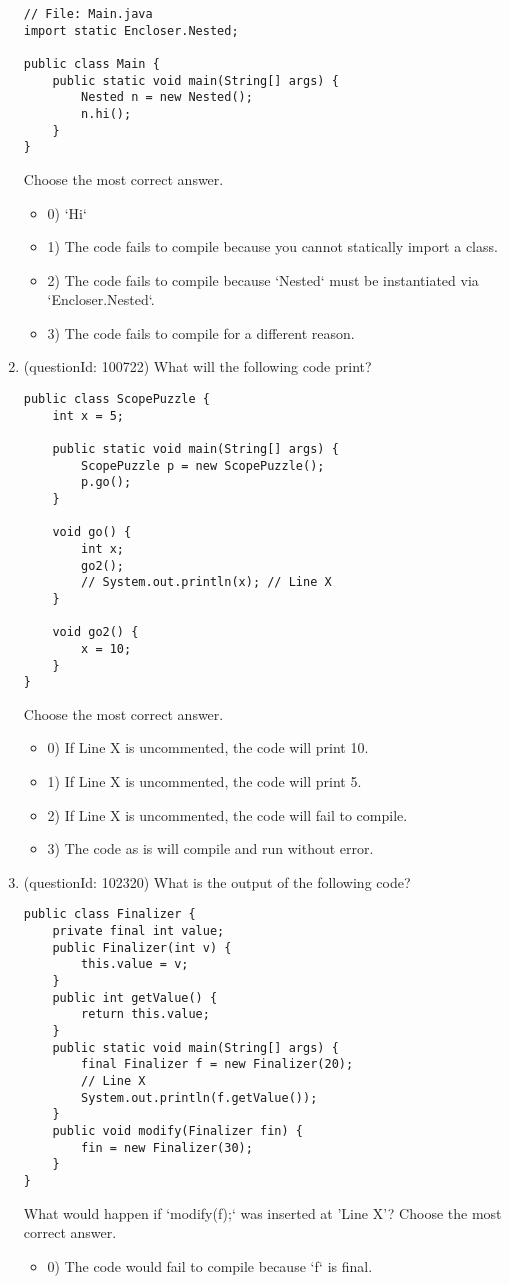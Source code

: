 \documentclass[12pt]{article}
\begin{document}
\begin{enumerate}[label=(\arabic*)]
\begin{verbatim}
// File: Main.java
import static Encloser.Nested;

public class Main {
    public static void main(String[] args) {
        Nested n = new Nested();
        n.hi();
    }
}
\end{verbatim}
Choose the most correct answer. 
\begin{itemize}
\item 0) `Hi`

\item 1) The code fails to compile because you cannot statically import a class.

\item 2) The code fails to compile because `Nested` must be instantiated via `Encloser.Nested`.

\item 3) The code fails to compile for a different reason.

\end{itemize}
\item (questionId: 100722) What will the following code print?\n\begin{verbatim}
public class ScopePuzzle {
    int x = 5;

    public static void main(String[] args) {
        ScopePuzzle p = new ScopePuzzle();
        p.go();
    }

    void go() {
        int x;
        go2();
        // System.out.println(x); // Line X
    }

    void go2() {
        x = 10;
    }
}
\end{verbatim}
Choose the most correct answer. 
\begin{itemize}
\item 0) If Line X is uncommented, the code will print 10.

\item 1) If Line X is uncommented, the code will print 5.

\item 2) If Line X is uncommented, the code will fail to compile.

\item 3) The code as is will compile and run without error.

\end{itemize}
\item (questionId: 102320) What is the output of the following code?\n\begin{verbatim}
public class Finalizer {
    private final int value;
    public Finalizer(int v) {
        this.value = v;
    }
    public int getValue() {
        return this.value;
    }
    public static void main(String[] args) {
        final Finalizer f = new Finalizer(20);
        // Line X
        System.out.println(f.getValue());
    }
    public void modify(Finalizer fin) {
        fin = new Finalizer(30);
    }
}
\end{verbatim}
What would happen if `modify(f);` was inserted at 'Line X'?
Choose the most correct answer. 
\begin{itemize}
\item 0) The code would fail to compile because `f` is final.


\end{itemize}
\end{enumerate}
\end{document}
